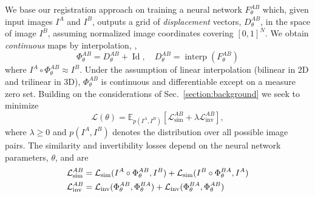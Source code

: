 We base our registration approach on training a neural network $F_\theta^{AB}$ which, given input images $I^A$ and $I^B$, outputs a grid of \emph{displacement} vectors, $D_\theta^{AB}$, in the space of image $I^B$, assuming normalized image coordinates covering $[0,1]^N$. We obtain \emph{continuous} maps by interpolation, \ie, 
\begin{equation}
  \Phi_\theta^{AB} = D_{\theta}^{AB} + \operatorname{Id}, \quad D_{\theta}^{AB} = \operatorname{interp}(F_{\theta}^{AB})
  \label{eq:map_interpolation}
\end{equation}
where $I^A\circ\Phi_\theta^{AB} \approx I^B$. Under the assumption of linear interpolation (bilinear in 2D and trilinear in 3D), $\Phi_\theta^{AB}$ is continuous and differentiable except on a measure zero set. Building on the considerations of Sec.~\ref{section:background} we seek to minimize %
\begin{equation}
  \mathcal{L}(\theta) = \mathbb{E}_{p(I^A,I^B)}\left[\mathcal{L}_{\text{sim}}^{AB} + \lambda \mathcal{L}_{\text{inv}}^{AB}\right],\label{eq:overall_loss}
\end{equation}
where $\lambda\geq 0$ and $p(I^A,I^B)$ denotes the distribution over all possible image pairs. The similarity and invertibility losses depend on the neural network parameters, $\theta$, and are 
\begin{alignat}{1}
  \mathcal{L}_{\text{sim}}^{AB} &= \mathcal{L}_{\text{sim}}(I^A \circ \Phi_\theta^{AB}, I^B) + \mathcal{L}_{\text{sim}}(I^B \circ \Phi_\theta^{BA}, I^A) \notag \\
  \mathcal{L}_{\text{inv}}^{AB} &= \mathcal{L}_{\text{inv}}(\Phi_\theta^{AB},\Phi_\theta^{BA}) + \mathcal{L}_{\text{inv}}(\Phi_\theta^{BA},\Phi_\theta^{AB})
\label{eqn:similarity_and_consistency_loss}
\end{alignat}

